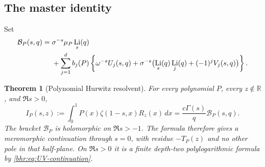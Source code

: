 \documentclass[11pt]{article}
\numberwithin{equation}{section}
\theoremstyle{plain}
\newtheorem{theorem}{Theorem}[section]
\theoremstyle{definition}
\theoremstyle{remark}
\DeclareMathOperator{\Li}{Li}
\newcommand{\R}{\mathbb R}
\begin{document}
\subsection{The master identity}

Set
\begin{align}\label{bhr:eq:Bpoly}
 \mathcal B_P(s,q)
   ={}&\sigma^{-s}\mu_P\Li_s(q)\notag\\
    &+\sum_{j=1}^d b_j(P)
       \left\{\omega^{-s}U_j(s,q)
        +\sigma^{-s}\bigl(\Li_s(q)\Li_j(q)
                              +(-1)^jV_j(s,q)\bigr)\right\}.
\end{align}

\begin{theorem}[Polynomial Hurwitz resolvent]\label{bhr:thm:weighted-master}
For every polynomial $P$, every $z\notin\R$, and $\Re s>0$,
\begin{equation}\label{bhr:eq:weighted-master}
 \boxed{\displaystyle
 I_P(s,z):=\int_0^1P(x)\zeta(1-s,x)R_z(x)\,dx
          =\frac{c\Gamma(s)}q\mathcal B_P(s,q).}
\end{equation}
The bracket $\mathcal B_P$ is holomorphic on $\Re s>-1$.
The formula therefore gives a meromorphic continuation through
$s=0$, with residue $-T_P(z)$ and no other pole in that half-plane.
On $\Re s>0$ it is a finite depth-two polylogarithmic formula
by \eqref{bhr:eq:UV-continuation}.
\end{theorem}
\end{document}
